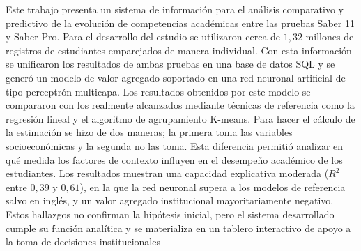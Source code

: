 Este trabajo presenta un sistema de información para el análisis comparativo y predictivo de la evolución de competencias académicas entre las pruebas Saber 11 y Saber Pro. Para el desarrollo del estudio se utilizaron cerca de $1,32$ millones de registros de estudiantes emparejados de manera individual. Con esta información se unificaron los resultados de ambas pruebas en una base de datos SQL y se generó un modelo de valor agregado soportado en una red neuronal artificial de tipo perceptrón multicapa. Los resultados obtenidos por este modelo se compararon con los realmente alcanzados mediante técnicas de referencia como la regresión lineal y el algoritmo de agrupamiento K-means. Para hacer el cálculo de la estimación se hizo de dos maneras; la primera toma las variables socioeconómicas y la segunda no las toma. Esta diferencia permitió analizar en qué medida los factores de contexto influyen en el desempeño académico de los estudiantes. Los resultados muestran una capacidad explicativa moderada ($R^2$ entre $0,39$ y $0,61$), en la que la red neuronal supera a los modelos de referencia salvo en inglés, y un valor agregado institucional mayoritariamente negativo. Estos hallazgos no confirman la hipótesis inicial, pero el sistema desarrollado cumple su función analítica y se materializa en un tablero interactivo de apoyo a la toma de decisiones institucionales



